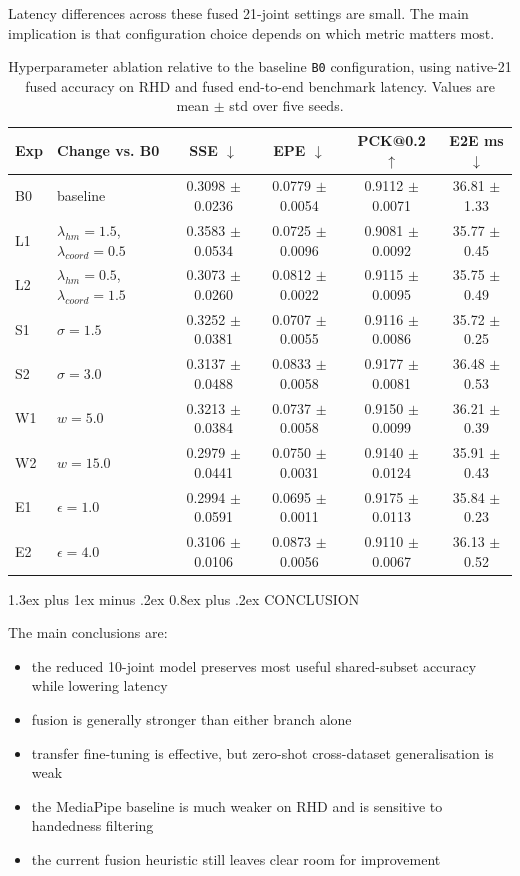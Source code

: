 \documentclass[10pt,letterpaper]{article}
\makeatletter
\renewcommand\section{\@startsection{section}{1}{\z@}%
  {1.3ex plus 1ex minus .2ex}%
  {0.8ex plus .2ex}%
  {\centering\normalfont\small\scshape}}
\makeatother
\begin{document}
Latency differences across these fused 21-joint settings are small. The main implication is that configuration choice depends on which metric matters most.

\begin{table}[H]
\centering
\footnotesize
\caption{Hyperparameter ablation relative to the baseline \texttt{B0} configuration, using native-21 fused accuracy on RHD and fused end-to-end benchmark latency. Values are mean $\pm$ std over five seeds.}
\label{tab:hyper_ablation}
\begin{tabular}{llcccc}
\toprule
Exp & Change vs. B0 & SSE $\downarrow$ & EPE $\downarrow$ & PCK@0.2 $\uparrow$ & E2E ms $\downarrow$ \\
\midrule
B0 & baseline & 0.3098 $\pm$ 0.0236 & 0.0779 $\pm$ 0.0054 & 0.9112 $\pm$ 0.0071 & 36.81 $\pm$ 1.33 \\
L1 & $\lambda_{hm}=1.5$, $\lambda_{coord}=0.5$ & 0.3583 $\pm$ 0.0534 & 0.0725 $\pm$ 0.0096 & 0.9081 $\pm$ 0.0092 & 35.77 $\pm$ 0.45 \\
L2 & $\lambda_{hm}=0.5$, $\lambda_{coord}=1.5$ & 0.3073 $\pm$ 0.0260 & 0.0812 $\pm$ 0.0022 & 0.9115 $\pm$ 0.0095 & 35.75 $\pm$ 0.49 \\
S1 & $\sigma=1.5$ & 0.3252 $\pm$ 0.0381 & 0.0707 $\pm$ 0.0055 & 0.9116 $\pm$ 0.0086 & 35.72 $\pm$ 0.25 \\
S2 & $\sigma=3.0$ & 0.3137 $\pm$ 0.0488 & 0.0833 $\pm$ 0.0058 & 0.9177 $\pm$ 0.0081 & 36.48 $\pm$ 0.53 \\
W1 & $w=5.0$ & 0.3213 $\pm$ 0.0384 & 0.0737 $\pm$ 0.0058 & 0.9150 $\pm$ 0.0099 & 36.21 $\pm$ 0.39 \\
W2 & $w=15.0$ & 0.2979 $\pm$ 0.0441 & 0.0750 $\pm$ 0.0031 & 0.9140 $\pm$ 0.0124 & 35.91 $\pm$ 0.43 \\
E1 & $\epsilon=1.0$ & 0.2994 $\pm$ 0.0591 & 0.0695 $\pm$ 0.0011 & 0.9175 $\pm$ 0.0113 & 35.84 $\pm$ 0.23 \\
E2 & $\epsilon=4.0$ & 0.3106 $\pm$ 0.0106 & 0.0873 $\pm$ 0.0056 & 0.9110 $\pm$ 0.0067 & 36.13 $\pm$ 0.52 \\
\bottomrule
\end{tabular}
\end{table}

\section{CONCLUSION}

The main conclusions are:
\begin{itemize}
\item the reduced 10-joint model preserves most useful shared-subset accuracy while lowering latency
\item fusion is generally stronger than either branch alone
\item transfer fine-tuning is effective, but zero-shot cross-dataset generalisation is weak
\item the MediaPipe baseline is much weaker on RHD and is sensitive to handedness filtering
\item the current fusion heuristic still leaves clear room for improvement
\end{itemize}
\end{document}

